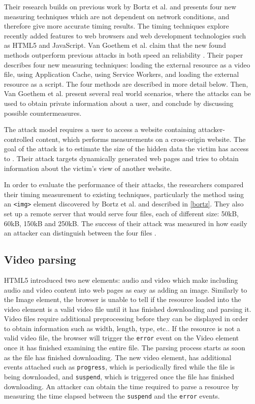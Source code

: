 \documentclass[10pt,a4paper,twoside]{book}
\begin{document}
Their research builds on previous work by Bortz et al.\cite{bortz2007exposing} and presents four new measuring techniques which are not dependent on network conditions, and therefore give more accurate timing results. The timing techniques explore recently added features to web browsers and web development technologies such as HTML5 and JavaScript. Van Goethem et al. claim that the new found methods outperform previous attacks in both speed an reliability \cite{van2015clock}. Their paper describes four new measuring techniques: loading the external resource as a video file, using Application Cache, using Service Workers, and loading the external resource as a script. The four methods are described in more detail below. Then, Van Goethem et al. \cite{van2015clock} present several real world scenarios, where the attacks can be used to obtain private information about a user, and conclude by discussing possible countermeasures.

The attack model requires a user to access a website containing attacker- controlled content, which performs measurements on a cross-origin website. The goal of the attack is to estimate the size of the hidden data the victim has access to \cite{van2015clock}. Their attack targets dynamically generated web pages and tries to obtain information about the victim's view of another website. 

In order to evaluate the performance of their attacks, the researchers compared their timing measurement to existing techniques, particularly the method using an \texttt{<img>} element discovered by Bortz et al. and described in \ref{bortz}. They also set up a remote server that would serve four files, each of different size: 50kB, 60kB, 150kB and 250kB. The success of their attack was measured in how easily an attacker can distinguish between the four files \cite{van2015clock}.

\subsection{Video parsing}
HTML5 introduced two new elements: audio and video which make including audio and video content into web pages as easy as adding an image. Similarly to the Image element, the browser is unable to tell if the resource loaded into the video element is a valid video file until it has finished downloading and parsing it. Video files require additional preprocessing before they can be displayed in order to obtain information such as width, length, type, etc.. If the resource is not a valid video file, the browser will trigger the \texttt{error} event on the Video element once it has finished examining the entire file. The parsing process starts as soon as the file has finished downloading. The new video element, has additional events attached such as \texttt{progress}, which is periodically fired while the file is being downloaded, and \texttt{suspend}, which is triggered once the file has finished downloading. An attacker can obtain the time required to parse a resource by measuring the time elapsed between the \texttt{suspend} and the \texttt{error} events.
\end{document}
